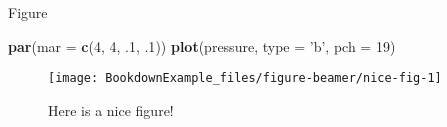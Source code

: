 \documentclass[
  ignorenonframetext,
  noamsthm,11pt,a4paper,blue,xcolor=table]{beamer}
\newenvironment{Shaded}{\begin{snugshade}}{\end{snugshade}}
\newcommand{\DataTypeTok}[1]{\textcolor[rgb]{0.13,0.29,0.53}{#1}}
\newcommand{\DecValTok}[1]{\textcolor[rgb]{0.00,0.00,0.81}{#1}}
\newcommand{\FloatTok}[1]{\textcolor[rgb]{0.00,0.00,0.81}{#1}}
\newcommand{\KeywordTok}[1]{\textcolor[rgb]{0.13,0.29,0.53}{\textbf{#1}}}
\newcommand{\NormalTok}[1]{#1}
\newcommand{\StringTok}[1]{\textcolor[rgb]{0.31,0.60,0.02}{#1}}
\begin{document}
\begin{frame}[fragile]{Figure}
\protect\hypertarget{figure}{}

\begin{Shaded}
\begin{Highlighting}[]
\KeywordTok{par}\NormalTok{(}\DataTypeTok{mar =} \KeywordTok{c}\NormalTok{(}\DecValTok{4}\NormalTok{, }\DecValTok{4}\NormalTok{, }\FloatTok{.1}\NormalTok{, }\FloatTok{.1}\NormalTok{))}
\KeywordTok{plot}\NormalTok{(pressure, }\DataTypeTok{type =} \StringTok{'b'}\NormalTok{, }\DataTypeTok{pch =} \DecValTok{19}\NormalTok{)}
\end{Highlighting}
\end{Shaded}

\begin{figure}

{\centering \texttt{[image: BookdownExample\_files/figure-beamer/nice-fig-1]} 

}

\caption{Here is a nice figure!}\label{fig:nice-fig}
\end{figure}

\end{frame}
\end{document}
